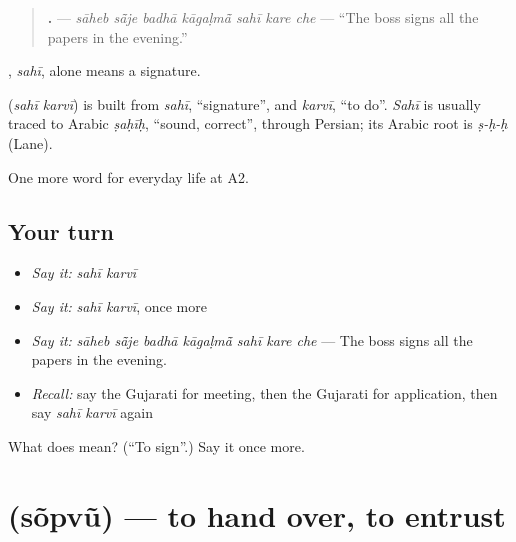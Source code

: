 \begin{quote}
\textbf{      .} — \emph{sāheb sā̃je badhā kāgaḷmā̃ sahī kare che} — \textquotedblleft{}The boss signs all the papers in the evening.\textquotedblright{}
\end{quote}

\textbf{}, \emph{sahī}, alone means a signature.

\begin{cousinweb}
\textbf{ } (\emph{sahī karvī}) is built from \emph{sahī}, \textquotedblleft{}signature\textquotedblright{}, and \emph{karvī}, \textquotedblleft{}to do\textquotedblright{}. \emph{Sahī} is usually traced to Arabic \emph{ṣaḥīḥ}, \textquotedblleft{}sound, correct\textquotedblright{}, through Persian; its Arabic root is \emph{ṣ-ḥ-ḥ} (Lane).
\end{cousinweb}

\begin{grammarlens}[title={What you've built}]
One more word for everyday life at A2.
\end{grammarlens}

\subsection*{Your turn}
\begin{itemize}
\raggedright
  \item \emph{Say it:} \emph{sahī karvī}
  \item \emph{Say it:} \emph{sahī karvī}, once more
  \item \emph{Say it:} \emph{sāheb sā̃je badhā kāgaḷmā̃ sahī kare che} — The boss signs all the papers in the evening.
  \item \emph{Recall:} say the Gujarati for meeting, then the Gujarati for application, then say \emph{sahī karvī} again
\end{itemize}

\begin{tcolorbox}[breakable,colback=teal!4,colframe=teal!35!black,title={Before you move on}]
What does   mean? (\textquotedblleft{}To sign\textquotedblright{}.) Say it once more.
\end{tcolorbox}
\section[\texorpdfstring{\gu{સોંપવું} (sõpvũ)}{સોંપવું (sõpvũ)}]{ (sõpvũ) — to hand over, to entrust}

